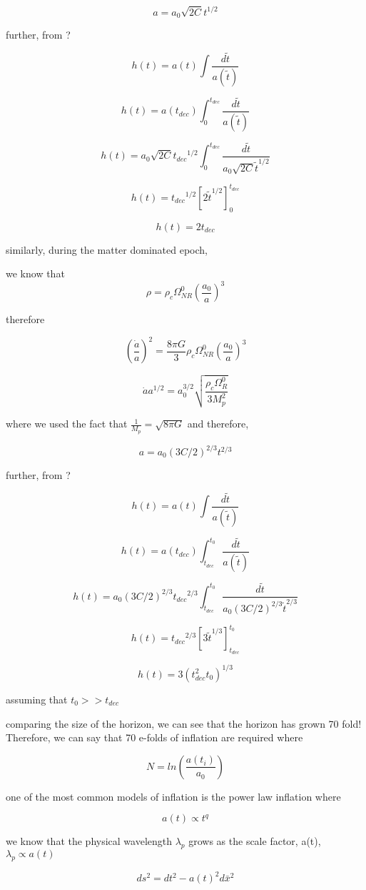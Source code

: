 \documentclass[12pt, a4paper]{report}
\begin{document}
$$a = a_0 \sqrt{2C}t^{1/2}$$

further, from ?

$$h(t) = a(t)\int\frac{d\tilde{t}}{a(\tilde{t})}$$

$$h(t) = a(t_{dec})\int^{t_{dec}}_0\frac{d\tilde{t}}{a(\tilde{t})}$$

$$h(t) = a_0 \sqrt{2C}{t_{dec}}^{1/2}\int^{t_{dec}}_0\frac{d\tilde{t}}{a_0 \sqrt{2C}{\tilde{t}}^{1/2}}$$

$$h(t) = {t_{dec}}^{1/2}[{2{\tilde{t}}^{1/2}}]^{t_{dec}}_0$$

$$h(t) = {2t_{dec}}$$

similarly, during the matter dominated epoch, 

we know that
$$\rho = \rho_c\Omega_{NR}^0(\frac{a_0}{a})^3$$

therefore

$$(\frac{\dot{a}}{a})^2 = \frac{8\pi G}{3}\rho_c\Omega_{NR}^0(\frac{a_0}{a})^3$$

$$\dot{a}{a^{1/2}} = a_0^{3/2}\sqrt{\frac{\rho_c\Omega_R^0}{3M_p^2}}$$

where we used the fact that $\frac{1}{M_p} = \sqrt{8\pi G}$ and therefore,

$$a = a_0 (3C/2)^{2/3}t^{2/3}$$

further, from ?

$$h(t) = a(t)\int\frac{d\tilde{t}}{a(\tilde{t})}$$

$$h(t) = a(t_{dec})\int^{t_0}_{t_{dec}}\frac{d\tilde{t}}{a(\tilde{t})}$$

$$h(t) = a_0 (3C/2)^{2/3}{t_{dec}}^{2/3}\int^{t_0}_{t_{dec}}\frac{d\tilde{t}}{a_0 (3C/2)^{2/3}{\tilde{t}}^{2/3}}$$

$$h(t) = {t_{dec}}^{2/3}[{3{\tilde{t}}^{1/3}}]^{t_0}_{t_{dec}}$$

$$h(t) = {3(t_{dec}^2t_0)^{1/3}}$$

assuming that $t_0 >> t_{dec}$

comparing the size of the horizon, we can see that the horizon has grown 70 fold! Therefore, we can say that 70 e-folds of inflation are required where

$$N = ln(\frac{a(t_i)}{a_0})$$

one of the most common models of inflation is the power law inflation where

$$a(t) \propto t^q$$

we know that the physical wavelength $\lambda_p$ grows as the scale factor, a(t), $\lambda_p \propto a(t)$

$$ds^2 = dt^2 - a(t)^2 d\bar{x}^2$$
\end{document}
